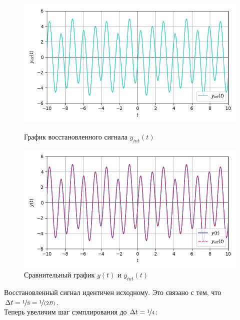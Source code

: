 \documentclass[a4paper]{article}
\begin{document}
\begin{figure}[H]
    \begin{minipage}{0.49\textwidth}
        \centering \includegraphics[width=\textwidth]{sources/second/sins dt=0.125 B=4/4_y_interp.png}
        \caption{График восстановленного сигнала $y_{int}(t)$}
    \end{minipage}\hfill
    \begin{minipage}{0.49\textwidth}
        \centering \includegraphics[width=\textwidth]{sources/second/sins dt=0.125 B=4/5_y_cmp(interpolation).png}
        \caption{Сравнительный график $y(t)$ и $y_{int}(t)$}
    \end{minipage}
\end{figure}
Восстановленный сигнал идентичен исходному. Это связано с тем, что $\Delta t = \nicefrac{1}{8} = \nicefrac{1}{(2B)}$.\\[0.5em]
Теперь увеличим шаг сэмплирования до $\Delta t = \nicefrac{1}{4}$:
\end{document}
